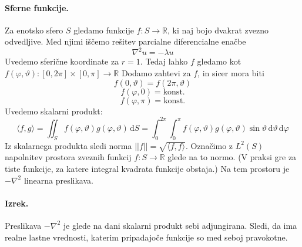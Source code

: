 \documentclass[a4paper]{article}
\newcommand{\dif}{\,\mathrm{d}}
\newcommand{\R}{\mathbb{R}}
\newcommand{\fn}[3]{{#1}\colon {#2} \rightarrow {#3}}
\newcommand{\avg}[1]{\langle {#1} \rangle}
\begin{document}
\paragraph{Sferne funkcije.} Za enotsko sfero \(S\) gledamo funkcije \(\fn{f}{S}{\R}\),
ki naj bojo dvakrat zvezno odvedljive. Med njimi iščemo rešitev parcialne diferencialne enačbe \[\nabla^2u = -\lambda u\]
Uvedemo sferične koordinate za \(r=1\). Tedaj lahko \(f\) gledamo kot \(\fn{f(\varphi, \vartheta)}{[0, 2\pi] \times [0, \pi]}{\R}\)
Dodamo zahtevi za \(f\), in sicer mora biti
\[f(0, \vartheta ) = f(2\pi, \vartheta)\]
\[f(\varphi, 0) = \mathrm{konst.}\]
\[f(\varphi, \pi) = \mathrm{konst.}\]
Uvedemo skalarni produkt:
\[\avg{f, g} = \iint_S f(\varphi, \vartheta) g(\varphi, \vartheta) \dif S = \int_{0}^{2\pi} \int_{0}^{\pi} f(\varphi, \vartheta)g(\varphi, \vartheta)\sin\vartheta\dif\vartheta\dif\varphi\]
Iz skalarnega produkta sledi norma \(||f|| = \sqrt{\avg{f, f}}\). Označimo z \(L^2(S)\) napolnitev prostora zveznih funkcij \(\fn{f}{S}{\R}\) glede na to normo.
(V praksi gre za tiste funkcije, za katere integral kvadrata funkcije obstaja.)
Na tem prostoru je \(-\nabla^2\) linearna preslikava.
\paragraph{Izrek.} Preslikava \(-\nabla^2\) je glede na dani skalarni produkt sebi adjungirana.
Sledi, da ima realne lastne vrednosti, katerim pripadajoče funkcije so med seboj pravokotne.
\end{document}
